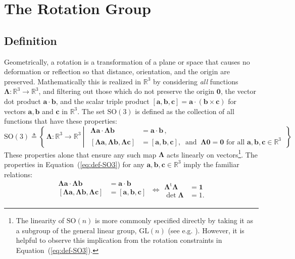 
\section{The Rotation Group}\label{sec:rotations}

\hypertarget{definition}{%
\subsection{Definition}\label{definition}}

Geometrically, a rotation is a transformation of a plane or space that causes no
deformation or reflection so that distance, orientation, and the origin
are preserved. Mathematically this is realized in \(\mathbb{R}^3\) by
considering \emph{all} functions
\(\bm{\Lambda}\colon \mathbb{R}^3\rightarrow \mathbb{R}^3\), and
filtering out those which do not preserve the origin \(\bm{0}\),
the vector dot product \(\bm{a}\cdot \bm{b}\),
and the scalar triple product
\([\bm{a},\bm{b},\bm{c}] = \bm{a}\cdot\left(\bm{b}\times\bm{c}\right)\)
for vectors \(\bm{a},\bm{b}\) and \(\bm{c}\) in \(\mathbb{R}^3\). The
set \(\mathrm{SO}(3)\) is defined as the collection of all functions
that have these properties: %
\begin{equation}
\mathrm{SO}(3) \triangleq \left\{\,
    \bm{\Lambda}\colon \mathbb{R}^3\rightarrow\mathbb{R}^3
~\left|~~
\begin{aligned}
\bm{\Lambda}\bm{a}\cdot\bm{\Lambda}\bm{b} &= \bm{a}\cdot\bm{b}\,
,  \\
[\bm{\Lambda a}, \bm{\Lambda b}, \bm{\Lambda c}]&=[\bm{a}, \bm{b}, \bm{c}]
,~\text{ and } ~\bm{\Lambda}\bm{0} = \bm{0}
\text{ for all }\bm{a},\bm{b},\bm{c}\in\mathbb{R}^3
\end{aligned}
\right.
\,\right\}
\label{eq:def-SO3}\end{equation}
These properties alone that ensure any such map \(\bm{\Lambda}\) acts linearly on vectors\footnote{The linearity of $\mathrm{SO}(n)$ is more commonly specified directly by taking it as a subgroup of the general linear group, $\mathrm{GL}(n)$ (see e.g. \cite{artin1991algebra}).
However, it is helpful to observe this implication from the rotation constraints in Equation~(\ref{eq:def-SO3}).}. 
The properties in Equation~(\ref{eq:def-SO3}) for any 
\(\bm{a},\bm{b},\bm{c}\in\mathbb{R}^3\)
imply the familiar relations:
\begin{equation*} 
\begin{aligned}
\bm{\Lambda}\bm{a}\cdot\bm{\Lambda}\bm{b} &= \bm{a}\cdot\bm{b}\,
  \\
[\bm{\Lambda a}, \bm{\Lambda b}, \bm{\Lambda c}]&=[\bm{a}, \bm{b}, \bm{c}] \\
\end{aligned} \ \Longleftrightarrow
\begin{aligned}
\bm{\Lambda}^{\mathrm{t}} \bm{\Lambda}&=\mathbf{1} \\
\det\bm{\Lambda} &= 1 .
\end{aligned}
\end{equation*}

